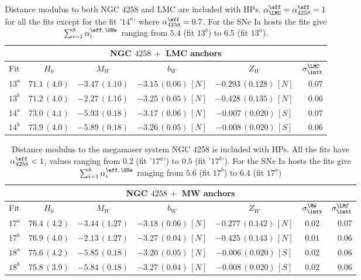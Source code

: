 \begin{table}[tbp]
\centering
\begin{tabular}{@{}lccccr}
\hline
\multicolumn{6}{c}{NGC $4258\,+$ LMC anchors} \\
\hline
Fit & $H_0$ & $M_W$ & $b_W$ & $Z_W$  &$\sigma_{\intt}^{\LMC}$ \\
\hline 
$13^a$ &$ 71.1\,(4.0)$ & $-3.47\,(1.10)$& $-3.15\,(0.06)\,[N]$& $-0.293\,(0.128)\,[N]$ & $0.07$ \\

$13^b$ &$ 71.2\,(4.0)$ & $-2.27\,(1.16)$& $-3.25\,(0.05)\,[N]$& $-0.428\,(0.135)\,[N]$ & $0.06$ \\

$14^a$ &$73.0\,(4.1)$ & $-5.93\,(0.18)$& $-3.17\,(0.06)\,[N]$& $-0.007\,(0.020)\,[S]$ & $0.07$ \\

$14^b$ &$73.9\,(4.0)$ & $-5.89\,(0.18)$& $-3.26\,(0.05)\,[N]$& $-0.008\,(0.020)\,[S]$ & $0.06$ \\
\hline  
\end{tabular}
\caption{Distance modulus to both NGC 4258 and LMC are included with HPs. $\alpha_{\LMC}^{\eff}=\alpha_{4258}^{\eff}=1$ for all the fits except for the fit '$14^a$' where $\alpha_{4258}^{\eff}=0.7$. For the SNe Ia hosts the fits give $\sum_{i=1}^{8} \alpha^{\eff,\,\SNe}_{i}$ ranging from $5.4$ (fit $13^b$) to $6.5$ (fit $13^a$). \label{Table:Joint-Constraints-NGC-LMC} }
\end{table}

\begin{table}[tbp]
\centering
\begin{tabular}{@{}lcccccr}
\hline 
\multicolumn{7}{c}{NGC $4258\, +$ MW anchors} \\
\hline
Fit & $H_0$ & $M_W$ & $b_W$ & $Z_W$ &$\sigma_{\intt}^{\MW}$ & $\sigma_{\intt}^{\LMC}$ \\
\hline 
$17^a$ & $76.4\,(4.2)$&$-3.44\,(1.27)$ &$-3.18\,(0.06)\,[N]$ &$-0.277\,(0.142)\,[N]$ & $0.02$& $0.07$\\
 
$17^b$ & $76.9\,(4.0)$&$-2.13\,(1.27)$ &$-3.27\,(0.04)\,[N]$ &$-0.425\,(0.143)\,[N]$ & $0.01$& $0.06$\\
 
$18^a$ &$75.6\,(4.2)$ &$-5.85\,(0.18)$ &$-3.20\,(0.05)\,[N]$ &$-0.006\,(0.020)\,[S]$ &$0.02$ & $0.06$\\

$18^b$ &$75.8\,(3.9)$ &$-5.84\,(0.18)$ &$-3.27\,(0.04)\,[N]$ &$-0.008\,(0.020)\,[S]$ &$0.02$ & $0.06$\\
\hline  
\end{tabular}
\caption{Distance modulus to the megamaser system NGC 4258 is included with HPs. All the fits have $\alpha_{4258}^{\eff}<1$, values ranging from $0.2$ (fit '$17^a$') to $0.5$ (fit '$17^b$'). For the SNe Ia hosts the fits give $\sum_{i=1}^{8} \alpha^{\eff,\,\SNe}_{i}$ ranging from $5.6$ (fit $17^b$) to $6.4$ (fit $17^a$) \label{Table:Joint-Constraints-NGC-MW} }
\end{table}

